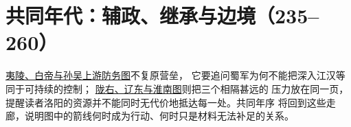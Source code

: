 \chapter{共同年代：辅政、继承与边境（235--260）}
\label{ch:war-frontiers}




\hyperref[fig:vol02b:yiling-river-defense]{夷陵、白帝与孙吴上游防务图}不复原营垒，
它要追问蜀军为何不能把深入江汉等同于可持续的控制；
\hyperref[fig:vol02b:northern-liaodong]{陇右、辽东与淮南图}则把三个相隔甚远的
压力放在同一页，提醒读者洛阳的资源并不能同时无代价地抵达每一处。共同年序
将回到这些走廊，说明图中的箭线何时成为行动、何时只是材料无法补足的关系。


